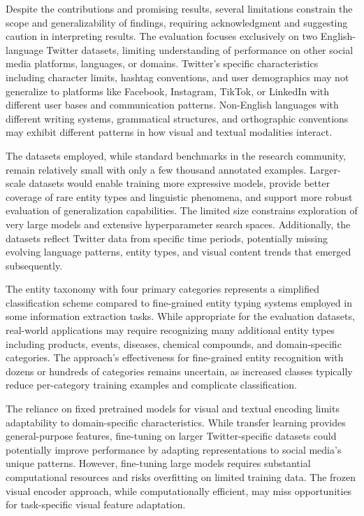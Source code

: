 \documentclass[12pt,a4paper]{report}
\begin{document}
Despite the contributions and promising results, several limitations constrain the scope and generalizability of findings, requiring acknowledgment and suggesting caution in interpreting results. The evaluation focuses exclusively on two English-language Twitter datasets, limiting understanding of performance on other social media platforms, languages, or domains. Twitter's specific characteristics including character limits, hashtag conventions, and user demographics may not generalize to platforms like Facebook, Instagram, TikTok, or LinkedIn with different user bases and communication patterns. Non-English languages with different writing systems, grammatical structures, and orthographic conventions may exhibit different patterns in how visual and textual modalities interact.

The datasets employed, while standard benchmarks in the research community, remain relatively small with only a few thousand annotated examples. Larger-scale datasets would enable training more expressive models, provide better coverage of rare entity types and linguistic phenomena, and support more robust evaluation of generalization capabilities. The limited size constrains exploration of very large models and extensive hyperparameter search spaces. Additionally, the datasets reflect Twitter data from specific time periods, potentially missing evolving language patterns, entity types, and visual content trends that emerged subsequently.

The entity taxonomy with four primary categories represents a simplified classification scheme compared to fine-grained entity typing systems employed in some information extraction tasks. While appropriate for the evaluation datasets, real-world applications may require recognizing many additional entity types including products, events, diseases, chemical compounds, and domain-specific categories. The approach's effectiveness for fine-grained entity recognition with dozens or hundreds of categories remains uncertain, as increased classes typically reduce per-category training examples and complicate classification.

The reliance on fixed pretrained models for visual and textual encoding limits adaptability to domain-specific characteristics. While transfer learning provides general-purpose features, fine-tuning on larger Twitter-specific datasets could potentially improve performance by adapting representations to social media's unique patterns. However, fine-tuning large models requires substantial computational resources and risks overfitting on limited training data. The frozen visual encoder approach, while computationally efficient, may miss opportunities for task-specific visual feature adaptation.
\end{document}
